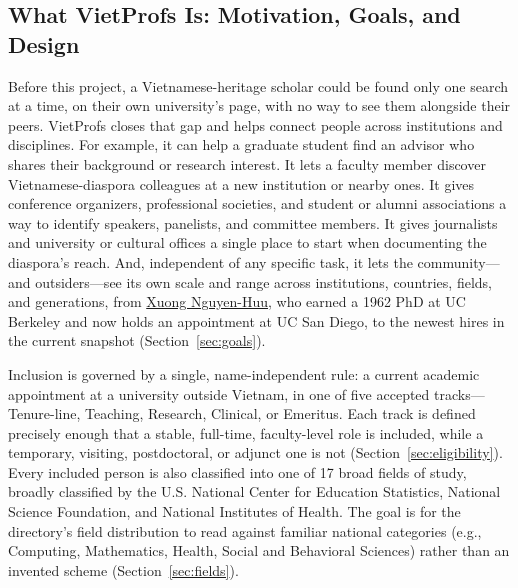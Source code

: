 \documentclass[11pt]{article}
\newcommand{\vplink}[2]{\href{https://vietprofs.roars.dev/?q=#1}{#2}}
\begin{document}
\subsection{What VietProfs Is: Motivation, Goals, and Design}
\label{sec:intro-what}
Before this project, a Vietnamese-heritage scholar could be found only one search at a time, on their own university's page, with no way to see them alongside their peers.
VietProfs closes that gap and helps connect people across institutions and disciplines.
For example, it can help a graduate student find an advisor who shares their background or research interest.
It lets a faculty member discover Vietnamese-diaspora colleagues at a new institution or nearby ones.
It gives conference organizers, professional societies, and student or alumni associations a way to identify speakers, panelists, and committee members.
It gives journalists and university or cultural offices a single place to start when documenting the diaspora's reach.
And, independent of any specific task, it lets the community---and outsiders---see its own scale and range across institutions, countries, fields, and generations, from \vplink{Xuong+Nguyen-Huu}{Xuong Nguyen-Huu}, who earned a 1962 PhD at UC Berkeley and now holds an appointment at UC San Diego, to the newest hires in the current snapshot (Section~\ref{sec:goals}).

Inclusion is governed by a single, name-independent rule: a current academic appointment at a university outside Vietnam, in one of five accepted tracks---Tenure-line, Teaching, Research, Clinical, or Emeritus.
Each track is defined precisely enough that a stable, full-time, faculty-level role is included, while a temporary, visiting, postdoctoral, or adjunct one is not (Section~\ref{sec:eligibility}).
Every included person is also classified into one of 17 broad fields of study,  broadly classified by the U.S. National Center for Education Statistics, National Science Foundation, and National Institutes of Health. %
The goal is for the directory's field distribution to read against familiar national categories (e.g., Computing, Mathematics, Health, Social and Behavioral Sciences) rather than an invented scheme (Section~\ref{sec:fields}).
\end{document}
